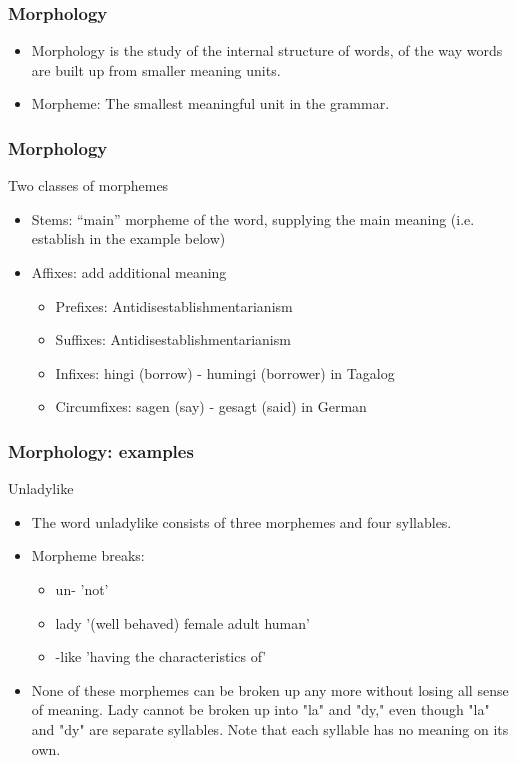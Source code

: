 \begin{frame}[fragile]
  \frametitle{Morphology}
  \begin{itemize}
  \item Morphology is the study of the internal structure of words, of the way words are built up from smaller meaning units.
  \item Morpheme: The smallest meaningful unit in the grammar.
  \end{itemize}
\end{frame}

\begin{frame}[fragile]
  \frametitle{Morphology}
Two classes of morphemes
    \begin{itemize}
  \item Stems: ``main'' morpheme of the word, supplying the main meaning (i.e. establish in the example below)
  \item Affixes: add additional meaning
    \begin{itemize}
  \item Prefixes: Antidisestablishmentarianism
  \item Suffixes: Antidisestablishmentarianism
  \item Infixes: hingi (borrow) - humingi (borrower) in Tagalog
  \item Circumfixes: sagen (say) - gesagt (said) in German
    \end{itemize}
  \end{itemize}
\end{frame}

\begin{frame}[fragile]
  \frametitle{Morphology: examples}
Unladylike
    \begin{itemize}
  \item The word unladylike consists of three morphemes and four syllables. 
  \item Morpheme breaks:
      \begin{itemize}
  \item un- 'not' 
  \item lady '(well behaved) female adult human' 
  \item -like 'having the characteristics of' 
      \end{itemize}
  \item None of these morphemes can be broken up any more without losing all sense of meaning. Lady cannot be broken up into "la" and "dy," even though "la" and "dy" are separate syllables. Note that each syllable has no meaning on its own. 
    \end{itemize}
\end{frame}

